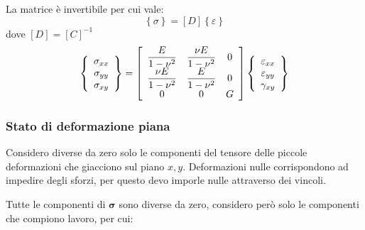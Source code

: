 La matrice è invertibile per cui vale:
\begin{equation*}
    \left\{\sigma\right\}=[D] \left\{\varepsilon\right\}
\end{equation*}
dove $[D] = [C]^{-1}$
\begin{equation*}
\left\{
\begin{array}{c}
\sigma_{xx} \\
\sigma_{yy} \\
\sigma_{xy}
\end{array}
\right\}
=
\left[
\begin{array}{ccc}
\displaystyle \frac{E}{1-\nu^2} & \displaystyle \frac{\nu E}{1-\nu^2} & \large{0}\\
\displaystyle \frac{\nu E}{1-\nu^2} & \displaystyle \frac{E}{1-\nu^2} & \large{0} \\
\large{0}& \large{0} & G
\end{array}
\right]
\left\{
\begin{array}{c}
\varepsilon_{xx} \\
\varepsilon_{yy} \\
\gamma_{xy}
\end{array}
\right\}
\end{equation*}

\subsubsection*{Stato di deformazione piana}
Considero diverse da zero solo le componenti del tensore delle piccole deformazioni che giacciono sul piano $x,y$. Deformazioni nulle corrispondono ad impedire degli sforzi, per questo devo imporle nulle attraverso dei vincoli.

Tutte le componenti di $\boldsymbol{\sigma} $ sono diverse da zero, considero però solo le componenti che compiono lavoro, per cui:


